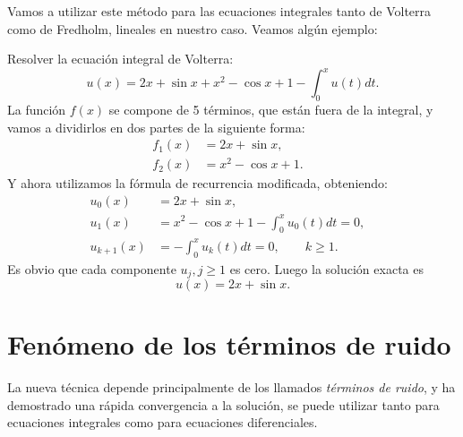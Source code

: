 Vamos a utilizar este método para las ecuaciones integrales tanto de Volterra como de Fredholm, lineales en nuestro caso. Veamos algún ejemplo:

\begin{ejemplo}
	Resolver la ecuación integral de Volterra:
	\begin{equation}
		u(x) = 2x + \sin x + x^2 - \cos x + 1 - \int_{0}^{x} u(t)dt.
	\end{equation}
	La función $f(x)$ se compone de 5 términos, que están fuera de la integral, y vamos a dividirlos en dos partes de la siguiente forma:
	\begin{align}
		f_1(x) &= 2x + \sin x,      &   \\
		f_2(x) &= x^2 - \cos x + 1.    &
	\end{align}
	Y ahora utilizamos la fórmula de recurrencia modificada, obteniendo:
	\begin{align}
		u_0(x) &= 2x + \sin x,      &   \\
		u_{1}(x) &= x^2 - \cos x + 1 - \int_{0}^{x} u_0(t)dt = 0,    &  \\
		u_{k+1}(x) &= - \int_{0}^{x} u_k(t)dt = 0, \qquad k \geqslant 1.    &
	\end{align}
	Es obvio que cada componente $u_j, j \geqslant 1$ es cero. Luego la solución exacta es
	\begin{equation}
		u(x) = 2x + \sin x.
	\end{equation}
\end{ejemplo}

\section{Fenómeno de los términos de ruido}
La nueva técnica depende principalmente de los llamados \textit{términos de ruido}, y ha demostrado una rápida convergencia a la solución, se puede utilizar tanto para ecuaciones integrales como para ecuaciones diferenciales.

